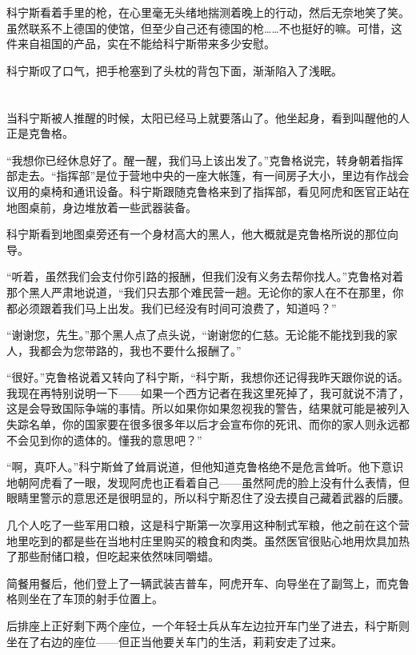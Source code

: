 科宁斯看着手里的枪，在心里毫无头绪地揣测着晚上的行动，然后无奈地笑了笑。虽然联系不上德国的使馆，但至少自己还有德国的枪……不也挺好的嘛。可惜，这件来自祖国的产品，实在不能给科宁斯带来多少安慰。

科宁斯叹了口气，把手枪塞到了头枕的背包下面，渐渐陷入了浅眠。

\section*{}

当科宁斯被人推醒的时候，太阳已经马上就要落山了。他坐起身，看到叫醒他的人正是克鲁格。

“我想你已经休息好了。醒一醒，我们马上该出发了。”克鲁格说完，转身朝着指挥部走去。“指挥部”是位于营地中央的一座大帐篷，有一间房子大小，里边有作战会议用的桌椅和通讯设备。科宁斯跟随克鲁格来到了指挥部，看见阿虎和医官正站在地图桌前，身边堆放着一些武器装备。

科宁斯看到地图桌旁还有一个身材高大的黑人，他大概就是克鲁格所说的那位向导。

“听着，虽然我们会支付你引路的报酬，但我们没有义务去帮你找人。”克鲁格对着那个黑人严肃地说道，“我们只去那个难民营一趟。无论你的家人在不在那里，你都必须跟着我们马上出发。我们已经没有时间可浪费了，知道吗？”

“谢谢您，先生。”那个黑人点了点头说，“谢谢您的仁慈。无论能不能找到我的家人，我都会为您带路的，我也不要什么报酬了。”

“很好。”克鲁格说着又转向了科宁斯，“科宁斯，我想你还记得我昨天跟你说的话。我现在再特别说明一下——如果一个西方记者在我这里死掉了，我可就说不清了，这是会导致国际争端的事情。所以如果你如果忽视我的警告，结果就可能是被列入失踪名单，你的国家要在很多很多年以后才会宣布你的死讯、而你的家人则永远都不会见到你的遗体的。懂我的意思吧？”

“啊，真吓人。”科宁斯耸了耸肩说道，但他知道克鲁格绝不是危言耸听。他下意识地朝阿虎看了一眼，发现阿虎也正看着自己——虽然阿虎的脸上没有什么表情，但眼睛里警示的意思还是很明显的，所以科宁斯忍住了没去摸自己藏着武器的后腰。

几个人吃了一些军用口粮，这是科宁斯第一次享用这种制式军粮，他之前在这个营地里吃到的都是些在当地村庄里购买的粮食和肉类。虽然医官很贴心地用炊具加热了那些耐储口粮，但吃起来依然味同嚼蜡。

简餐用餐后，他们登上了一辆武装吉普车，阿虎开车、向导坐在了副驾上，而克鲁格则坐在了车顶的射手位置上。

后排座上正好剩下两个座位，一个年轻士兵从车左边拉开车门坐了进去，科宁斯则坐在了右边的座位——但正当他要关车门的生活，莉莉安走了过来。

